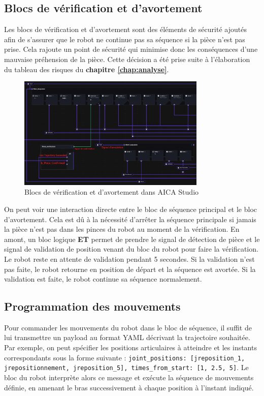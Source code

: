 \subsection{Blocs de vérification et d'avortement}

Les blocs de vérification et d'avortement sont des éléments de sécurité ajoutés afin de s'assurer que le robot ne continue pas sa séquence si la pièce n'est pas prise. Cela rajoute un point de sécurité qui minimise donc les conséquences d'une mauvaise préhension de la pièce.  Cette décision a été prise suite à l'élaboration du tableau des risques du \textbf{chapitre \ref{chap:analyse}}.

\begin{figure}[H]
    \centering
    \includegraphics[width=0.8\textwidth]{assets/figures/AICA_abort_sequence.png}
    \caption{Blocs de vérification et d'avortement dans AICA Studio}
    \label{fig:verification_block}
\end{figure}

On peut voir une interaction directe entre le bloc de séquence principal et le bloc d'avortement. Cela est dû à la nécessité d'arrêter la séquence principale si jamais la pièce n'est pas dans les pinces du robot au moment de la vérification. En amont, un bloc logique \textbf{ET} permet de prendre le signal de détection de pièce et le signal de validation de position venant du bloc du robot pour faire la vérification. Le robot reste en attente de validation pendant 5 secondes. Si la validation n'est pas faite, le robot retourne en position de départ et la séquence est avortée. Si la validation est faite, le robot continue sa séquence normalement.

\subsection{Programmation des mouvements}

Pour commander les mouvements du robot dans le bloc de séquence, il suffit de lui transmettre un \gls{payload} au format YAML décrivant la trajectoire souhaitée. Par exemple, on peut spécifier les positions articulaires à atteindre et les instants correspondants sous la forme suivante :
\texttt{{joint\_positions: [jreposition\_1, jrepositionnement, jreposition\_5], times\_from\_start: [1, 2.5, 5]}}.
Le bloc du robot interprète alors ce message et exécute la séquence de mouvements définie, en amenant le bras successivement à chaque position à l’instant indiqué.

